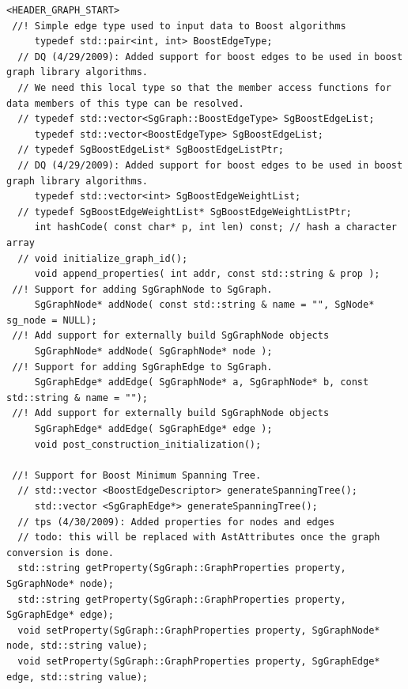\begin{enumerate}
\begin{lstlisting}
<HEADER_GRAPH_START>
 //! Simple edge type used to input data to Boost algorithms
     typedef std::pair<int, int> BoostEdgeType;
  // DQ (4/29/2009): Added support for boost edges to be used in boost graph library algorithms.
  // We need this local type so that the member access functions for data members of this type can be resolved.
  // typedef std::vector<SgGraph::BoostEdgeType> SgBoostEdgeList;
     typedef std::vector<BoostEdgeType> SgBoostEdgeList;
  // typedef SgBoostEdgeList* SgBoostEdgeListPtr;
  // DQ (4/29/2009): Added support for boost edges to be used in boost graph library algorithms.
     typedef std::vector<int> SgBoostEdgeWeightList;
  // typedef SgBoostEdgeWeightList* SgBoostEdgeWeightListPtr;
     int hashCode( const char* p, int len) const; // hash a character array
  // void initialize_graph_id();
     void append_properties( int addr, const std::string & prop );
 //! Support for adding SgGraphNode to SgGraph.
     SgGraphNode* addNode( const std::string & name = "", SgNode* sg_node = NULL);
 //! Add support for externally build SgGraphNode objects
     SgGraphNode* addNode( SgGraphNode* node );
 //! Support for adding SgGraphEdge to SgGraph.
     SgGraphEdge* addEdge( SgGraphNode* a, SgGraphNode* b, const std::string & name = "");
 //! Add support for externally build SgGraphNode objects
     SgGraphEdge* addEdge( SgGraphEdge* edge );
     void post_construction_initialization();

 //! Support for Boost Minimum Spanning Tree.
  // std::vector <BoostEdgeDescriptor> generateSpanningTree();
     std::vector <SgGraphEdge*> generateSpanningTree();
  // tps (4/30/2009): Added properties for nodes and edges
  // todo: this will be replaced with AstAttributes once the graph conversion is done.
  std::string getProperty(SgGraph::GraphProperties property, SgGraphNode* node);
  std::string getProperty(SgGraph::GraphProperties property, SgGraphEdge* edge);
  void setProperty(SgGraph::GraphProperties property, SgGraphNode* node, std::string value);
  void setProperty(SgGraph::GraphProperties property, SgGraphEdge* edge, std::string value);


\end{lstlisting}
\end{enumerate}
